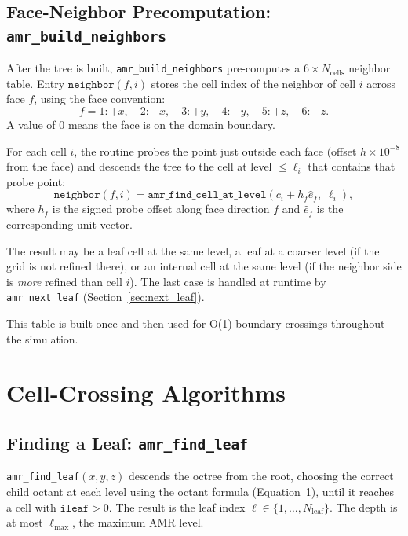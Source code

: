 \documentclass[english,a4paper]{my_memo}
\begin{document}
\subsection{Face-Neighbor Precomputation: \texttt{amr\_build\_neighbors}}
\label{sec:neighbor}

After the tree is built, \texttt{amr\_build\_neighbors} pre-computes a
$6 \times N_\mathrm{cells}$ neighbor table.  Entry
$\texttt{neighbor}(f, i)$ stores the cell index of the neighbor of cell $i$
across face $f$, using the face convention:
\begin{equation}
  f = 1{:}+x,\quad 2{:}-x,\quad 3{:}+y,\quad 4{:}-y,\quad 5{:}+z,\quad 6{:}-z.
\end{equation}
A value of 0 means the face is on the domain boundary.

For each cell $i$, the routine probes the point just outside each face
(offset $h \times 10^{-8}$ from the face) and descends the tree to the cell
at level $\le \ell_i$ that contains that probe point:
\begin{equation}
  \texttt{neighbor}(f, i) = \texttt{amr\_find\_cell\_at\_level}
    \!\left(c_i + h_f\hat{e}_f,\; \ell_i\right),
\end{equation}
where $h_f$ is the signed probe offset along face direction $f$ and
$\hat{e}_f$ is the corresponding unit vector.

The result may be a leaf cell at the same level, a leaf at a coarser level
(if the grid is not refined there), or an internal cell at the same level
(if the neighbor side is \emph{more} refined than cell $i$).  The last case
is handled at runtime by \texttt{amr\_next\_leaf} (Section~\ref{sec:next_leaf}).

This table is built once and then used for O(1) boundary crossings throughout
the simulation.

\section{Cell-Crossing Algorithms}

\subsection{Finding a Leaf: \texttt{amr\_find\_leaf}}

\texttt{amr\_find\_leaf}$(x, y, z)$ descends the octree from the root,
choosing the correct child octant at each level using the octant formula
(Equation~1), until it reaches a cell with $\texttt{ileaf} > 0$.
The result is the leaf index $\ell \in \{1, \ldots, N_\mathrm{leaf}\}$.
The depth is at most $\ell_\mathrm{max}$, the maximum AMR level.
\end{document}
